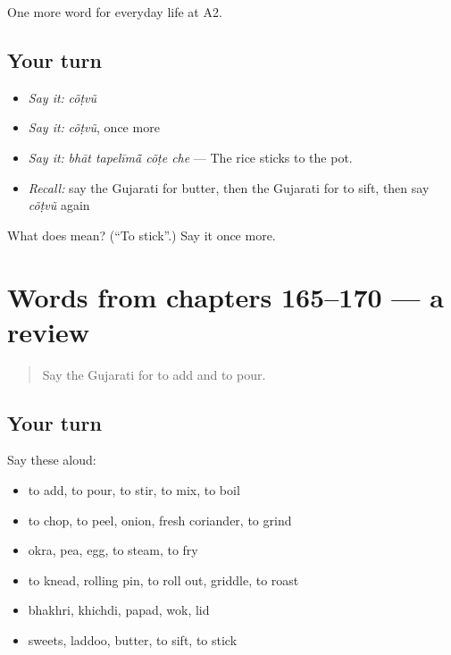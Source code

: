 \begin{grammarlens}[title={What you've built}]
One more word for everyday life at A2.
\end{grammarlens}

\subsection*{Your turn}
\begin{itemize}
\raggedright
  \item \emph{Say it:} \emph{cõṭvũ}
  \item \emph{Say it:} \emph{cõṭvũ}, once more
  \item \emph{Say it:} \emph{bhāt tapelīmā̃ cõṭe che} — The rice sticks to the pot.
  \item \emph{Recall:} say the Gujarati for butter, then the Gujarati for to sift, then say \emph{cõṭvũ} again
\end{itemize}

\begin{tcolorbox}[breakable,colback=teal!4,colframe=teal!35!black,title={Before you move on}]
What does  mean? (\textquotedblleft{}To stick\textquotedblright{}.) Say it once more.
\end{tcolorbox}
\section[(dialogue)]{Words from chapters 165–170 — a review}

\label{lesson:GU-R170-review-165-170}



\begin{quote}
Say the Gujarati for to add and to pour.
\end{quote}

\subsection*{Your turn}
Say these aloud:

\begin{itemize}
\raggedright
  \item to add, to pour, to stir, to mix, to boil
  \item to chop, to peel, onion, fresh coriander, to grind
  \item okra, pea, egg, to steam, to fry
  \item to knead, rolling pin, to roll out, griddle, to roast
  \item bhakhri, khichdi, papad, wok, lid
  \item sweets, laddoo, butter, to sift, to stick
\end{itemize}

